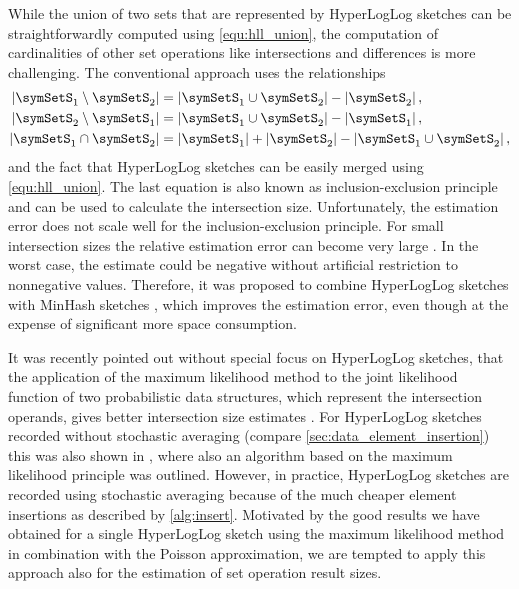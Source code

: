\documentclass[a4paper]{scrartcl}
\begin{document}
While the union of two sets that are represented by HyperLogLog sketches can be straightforwardly computed using \eqref{equ:hll_union}, the computation of cardinalities of other set operations like intersections and differences is more challenging. The conventional approach uses the relationships
\begin{equation}
\label{equ:conventional_approach}
\begin{aligned}
\left\vert\symSetS_1 \setminus \symSetS_2\right\vert
&=
\left\vert\symSetS_1 \cup \symSetS_2\right\vert
-
\left\vert\symSetS_2\right\vert,
\\
\left\vert\symSetS_2 \setminus \symSetS_1\right\vert
&=
\left\vert\symSetS_1 \cup \symSetS_2\right\vert
-
\left\vert\symSetS_1\right\vert,
\\
\left\vert\symSetS_1 \cap \symSetS_2\right\vert
&=  
\left\vert\symSetS_1\right\vert  
+
\left\vert\symSetS_2\right\vert
-
\left\vert\symSetS_1 \cup \symSetS_2\right\vert,
\end{aligned}
\end{equation}
and the fact that HyperLogLog sketches can be easily merged using \eqref{equ:hll_union}. The last equation is also known as inclusion-exclusion principle and can be used to calculate the intersection size. Unfortunately, the estimation error does not scale well for the inclusion-exclusion principle. For small intersection sizes the relative estimation error can become very large \cite{Dasgupta2015}. In the worst case, the estimate could be negative without artificial restriction to nonnegative values. Therefore, it was proposed to combine HyperLogLog sketches with MinHash sketches \cite{Pascoe2013, Cohen2016}, which improves the estimation error, even though at the expense of significant more space consumption. 

It was recently pointed out without special focus on HyperLogLog sketches, that the application of the maximum likelihood method to the joint likelihood function of two probabilistic data structures, which represent the intersection operands, gives better intersection size estimates \cite{Ting2016}. For HyperLogLog sketches recorded without stochastic averaging (compare \cref{sec:data_element_insertion}) this was also shown in \cite{Cohen2016}, where also an algorithm based on the maximum likelihood principle was outlined. However, in practice, HyperLogLog sketches are recorded using stochastic averaging because of the much cheaper element insertions as described by \cref{alg:insert}. Motivated by the good results we have obtained for a single HyperLogLog sketch using the maximum likelihood method in combination with the Poisson approximation, we are tempted to apply this approach also for the estimation of set operation result sizes.
\end{document}
